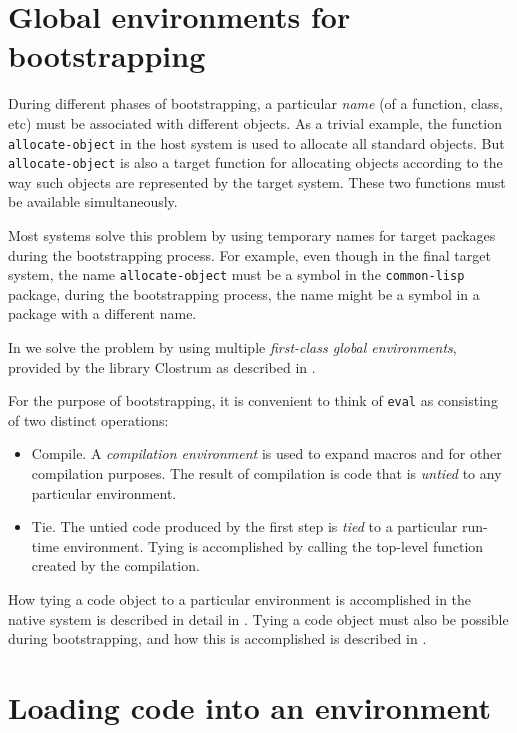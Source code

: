 \section{Global environments for bootstrapping}

During different phases of bootstrapping, a particular \emph{name} (of
a function, class, etc) must be associated with different objects.  As
a trivial example, the function \texttt{allocate-object} in the host
system is used to allocate all standard objects.  But
\texttt{allocate-object} is also a target function for allocating
objects according to the way such objects are represented by the
target system.  These two functions must be available simultaneously.

Most systems solve this problem by using temporary names for target
packages during the bootstrapping process.  For example, even though
in the final target system, the name \texttt{allocate-object} must be
a symbol in the \texttt{common-lisp} package, during the bootstrapping
process, the name might be a symbol in a package with a different
name.

In \sysname{} we solve the problem by using multiple \emph{first-class
  global environments}, provided by the library Clostrum as described
in .

For the purpose of bootstrapping, it is convenient to think of
\texttt{eval} as consisting of two distinct operations:

\begin{itemize}
\item Compile.  A \emph{compilation environment} is used to expand
  macros and for other compilation purposes.  The result of
  compilation is code that is \emph{untied} to any particular
  environment.
\item Tie.  The untied code produced by the first step is \emph{tied}
  to a particular run-time environment.  Tying is accomplished by
  calling the top-level function created by the compilation.
\end{itemize}

How tying a code object to a particular environment is accomplished in
the native system is described in detail in
.  Tying a code object must also be
possible during bootstrapping, and how this is accomplished is
described in .

\section{Loading code into an environment}

